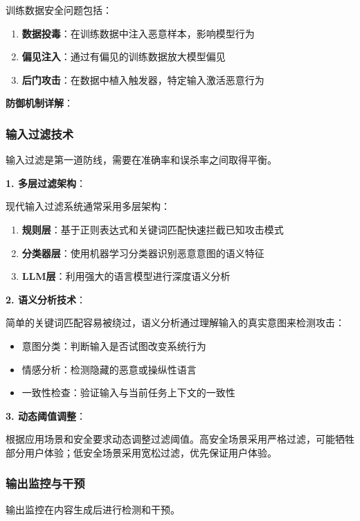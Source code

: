 训练数据安全问题包括：
\begin{enumerate}[leftmargin=2em]
    \item \textbf{数据投毒}：在训练数据中注入恶意样本，影响模型行为
    \item \textbf{偏见注入}：通过有偏见的训练数据放大模型偏见
    \item \textbf{后门攻击}：在数据中植入触发器，特定输入激活恶意行为
\end{enumerate}

\textbf{防御机制详解}：

\subsubsection{输入过滤技术}

输入过滤是第一道防线，需要在准确率和误杀率之间取得平衡。

\textbf{1. 多层过滤架构}：

现代输入过滤系统通常采用多层架构：
\begin{enumerate}[leftmargin=2em]
    \item \textbf{规则层}：基于正则表达式和关键词匹配快速拦截已知攻击模式
    \item \textbf{分类器层}：使用机器学习分类器识别恶意意图的语义特征
    \item \textbf{LLM层}：利用强大的语言模型进行深度语义分析
\end{enumerate}

\textbf{2. 语义分析技术}：

简单的关键词匹配容易被绕过，语义分析通过理解输入的真实意图来检测攻击：
\begin{itemize}[leftmargin=2em]
    \item 意图分类：判断输入是否试图改变系统行为
    \item 情感分析：检测隐藏的恶意或操纵性语言
    \item 一致性检查：验证输入与当前任务上下文的一致性
\end{itemize}

\textbf{3. 动态阈值调整}：

根据应用场景和安全要求动态调整过滤阈值。高安全场景采用严格过滤，可能牺牲部分用户体验；低安全场景采用宽松过滤，优先保证用户体验。

\subsubsection{输出监控与干预}

输出监控在内容生成后进行检测和干预。

